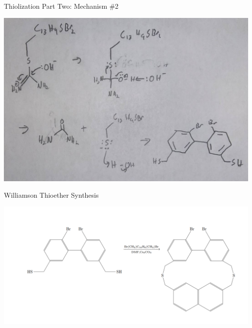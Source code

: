 \documentclass[notes]{beamer}
\begin{document}
\begin{frame}{Thiolization Part Two: Mechanism \#2}
\begin{center}
    \includegraphics[scale=.4]{thiolization_part_two_two.JPG}
\end{center}
\end{frame}



\begin{frame}{Williamson Thioether Synthesis}
\begin{center}
    \includegraphics[scale=.4]{williamson_thioether_synthesis_overall.PNG}
\end{center}
\end{frame}
\end{document}
